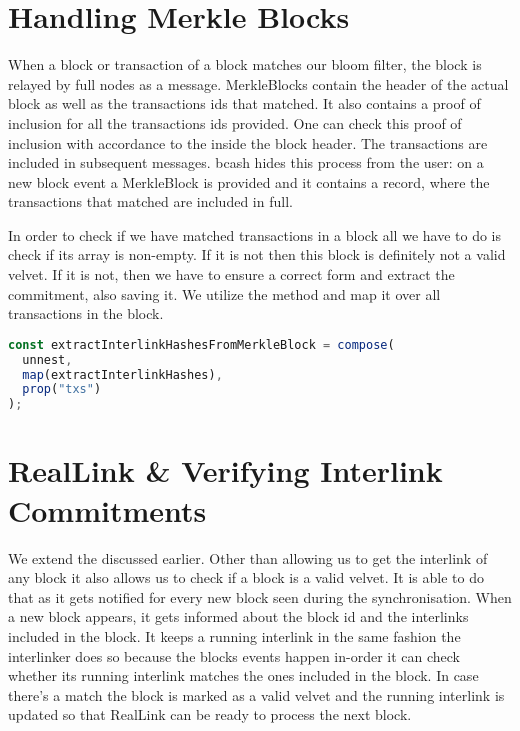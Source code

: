 \section{Handling Merkle Blocks}
When a block or transaction of a block matches our bloom filter, the block is relayed by full nodes as a  message. MerkleBlocks contain the header of the actual block as well as the transactions ids that matched. It also contains a proof of inclusion for all the transactions ids provided. One can check this proof of inclusion with accordance to the  inside the block header. The transactions are included in subsequent  messages. bcash hides this process from the user: on a new block event a MerkleBlock is provided and it contains a  record, where the transactions that matched are included in full.

In order to check if we have matched transactions in a block all we have to do is check if its  array is non-empty. If it is not then this block is definitely not a valid velvet. If it is not, then we have to ensure a correct form and extract the commitment, also saving it. We utilize the method  and map it over all transactions in the block.

\begin{lstlisting}[language=Javascript]
const extractInterlinkHashesFromMerkleBlock = compose(
  unnest,
  map(extractInterlinkHashes),
  prop("txs")
);
\end{lstlisting}

\section{RealLink \& Verifying Interlink Commitments}
We extend the  discussed earlier. Other than allowing us to get the interlink of any block it also allows us to check if a block is a valid velvet. It is able to do that as it gets notified for every new block seen during the synchronisation. When a new block appears, it gets informed about the block id and the interlinks included in the block. It keeps a running interlink in the same fashion the interlinker does so because the blocks events happen in-order it can check whether its running interlink matches the ones included in the block. In case there's a match the block is marked as a valid velvet and the running interlink is updated so that RealLink can be ready to process the next block.

